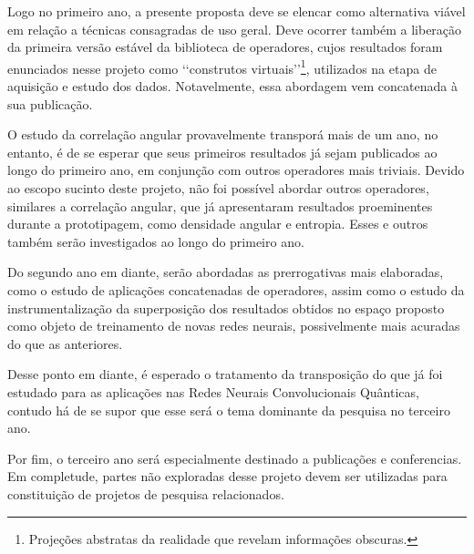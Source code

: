 \documentclass[a4paper, 12pt]{report}
\begin{document}
Logo no primeiro ano, a presente proposta deve se elencar como alternativa viável em relação a técnicas consagradas de uso geral. Deve ocorrer também a liberação da primeira versão estável da biblioteca de operadores, cujos resultados foram enunciados nesse projeto como {\lq\lq}construtos virtuais{\rq\rq}\footnote{Projeções abstratas da realidade que revelam informações obscuras.}, utilizados na etapa de aquisição e estudo dos dados. Notavelmente, essa abordagem vem concatenada à sua publicação.

O estudo da correlação angular provavelmente transporá mais de um ano,  no entanto, é de se esperar que seus primeiros resultados já sejam publicados ao longo do primeiro ano, em conjunção com outros operadores mais triviais. Devido ao escopo sucinto deste projeto, não foi possível abordar outros operadores, similares a correlação angular, que já apresentaram resultados proeminentes durante a prototipagem, como densidade angular e entropia. Esses e outros também serão investigados ao longo do primeiro ano.

Do segundo ano em diante, serão abordadas as prerrogativas mais elaboradas, como o estudo de aplicações concatenadas de operadores, assim como o estudo da instrumentalização da superposição dos resultados obtidos no espaço proposto como objeto de treinamento de novas redes neurais, possivelmente mais acuradas do que as anteriores. 

Desse ponto em diante, é esperado o tratamento da transposição do que já foi estudado para as aplicações nas Redes Neurais Convolucionais Quânticas, contudo há de se supor que esse será o tema dominante da pesquisa no terceiro ano. 

Por fim, o terceiro ano será especialmente destinado a publicações e conferencias. Em completude, partes não exploradas desse projeto devem ser utilizadas para constituição de projetos de pesquisa relacionados.


		
\end{document}
